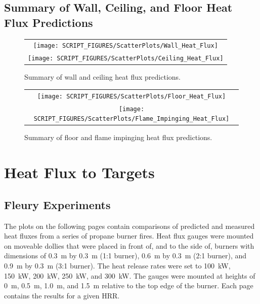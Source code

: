 \clearpage


\subsection{Summary of Wall, Ceiling, and Floor Heat Flux Predictions}

\begin{figure}[h!]
\begin{center}
\begin{tabular}{c}
\texttt{[image: SCRIPT\_FIGURES/ScatterPlots/Wall\_Heat\_Flux]} \\
\texttt{[image: SCRIPT\_FIGURES/ScatterPlots/Ceiling\_Heat\_Flux]}
\end{tabular}
\end{center}
\caption[Summary of wall and ceiling heat flux predictions]
{Summary of wall and ceiling heat flux predictions.}
\end{figure}

\begin{figure}[h!]
\begin{center}
\begin{tabular}{c}
\texttt{[image: SCRIPT\_FIGURES/ScatterPlots/Floor\_Heat\_Flux]} \\
\texttt{[image: SCRIPT\_FIGURES/ScatterPlots/Flame\_Impinging\_Heat\_Flux]}
\end{tabular}
\end{center}
\caption[Summary of floor and flame impinging heat flux predictions]
{Summary of floor and flame impinging heat flux predictions.}
\end{figure}



\clearpage

\section{Heat Flux to Targets}

\subsection{Fleury Experiments}

The plots on the following pages contain comparisons of predicted and measured heat fluxes from a series of propane burner fires. Heat flux gauges were mounted on moveable dollies that were placed in front of, and to the side of, burners with dimensions of 0.3~m by 0.3~m (1:1 burner), 0.6~m by 0.3~m (2:1 burner), and 0.9~m by 0.3~m (3:1 burner). The heat release rates were set to 100~kW, 150~kW, 200~kW, 250~kW, and 300~kW. The gauges were mounted at heights of 0~m, 0.5~m, 1.0~m, and 1.5~m relative to the top edge of the burner. Each page contains the results for a given HRR.

